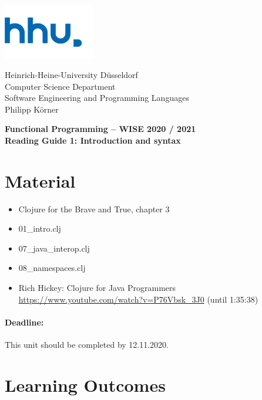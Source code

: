 \documentclass[11pt,a4paper]{article}
\begin{document}
\begin{minipage}[b]{\textwidth}
	\parbox[t]{5cm}{%
		\includegraphics[width=4cm]{unilogo}
		\hfill
	}
	\parbox[b]{11cm}{%
		Heinrich-Heine-University D\"usseldorf\\
		Computer Science Department\\
		Software Engineering and Programming Languages\\
		Philipp K\"orner
	}
\end{minipage}
\begin{center}
	\bf
	Functional Programming -- WISE 2020 / 2021\\
	Reading Guide 1: Introduction and syntax
\end{center}

\pagestyle{empty}

\section{Material} 

\begin{itemize}
\item Clojure for the Brave and True, chapter 3
\item 01\_intro.clj
\item 07\_java\_interop.clj
\item 08\_namespaces.clj
\item Rich Hickey: Clojure for Java Programmers \url{https://www.youtube.com/watch?v=P76Vbsk_3J0} (until 1:35:38)
\end{itemize}

\paragraph{Deadline:} This unit should be completed by 12.11.2020.

\section{Learning Outcomes}
\end{document}
